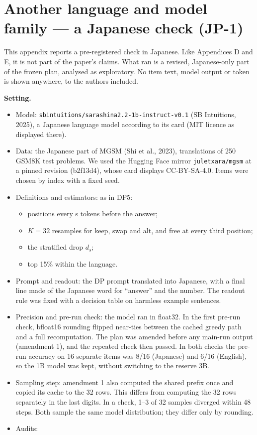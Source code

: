 \documentclass[
  10pt,
  a4paper,
]{article}
\providecommand{\tightlist}{%
  \setlength{\itemsep}{0pt}\setlength{\parskip}{0pt}}
\begin{document}
\hypertarget{another-language-and-model-family-a-japanese-check-jp-1}{%
\section{Another language and model family --- a Japanese check (JP-1)}\label{another-language-and-model-family-a-japanese-check-jp-1}}

This appendix reports a pre-registered check in Japanese. Like Appendices D and E, it is not part of the paper's claims. What ran is a revised, Japanese-only part of the frozen plan, analysed as
exploratory. No item text, model output or token is shown anywhere, to the authors included.

\textbf{Setting.}

\begin{itemize}
\tightlist
\item
  Model: \texttt{sbintuitions/sarashina2.2-1b-instruct-v0.1} (SB Intuitions, 2025), a Japanese language model according to its card (MIT licence as displayed there).
\item
  Data: the Japanese part of MGSM (Shi et al., 2023), translations of 250 GSM8K test problems. We used the Hugging Face mirror \texttt{juletxara/mgsm} at a pinned revision (b2f13d4), whose card
  displays CC-BY-SA-4.0. Items were chosen by index with a fixed seed.
\item
  Definitions and estimators: as in DP5:

  \begin{itemize}
  \tightlist
  \item
    positions every s tokens before the answer;
  \item
    \(K = 32\) resamples for keep, swap and alt, and free at every third position;
  \item
    the stratified drop \(d_{s}\);
  \item
    top 15\% within the language.
  \end{itemize}
\item
  Prompt and readout: the DP prompt translated into Japanese, with a final line made of the Japanese word for ``answer'' and the number. The readout rule was fixed with a decision table on harmless
  example sentences.
\item
  Precision and pre-run check: the model ran in float32. In the first pre-run check, bfloat16 rounding flipped near-ties between the cached greedy path and a full recomputation. The plan was amended
  before any main-run output (amendment 1), and the repeated check then passed. In both checks the pre-run accuracy on 16 separate items was 8/16 (Japanese) and 6/16 (English), so the 1B model was
  kept, without switching to the reserve 3B.
\item
  Sampling step: amendment 1 also computed the shared prefix once and copied its cache to the 32 rows. This differs from computing the 32 rows separately in the last digits. In a check, 1--3 of 32
  samples diverged within 48 steps. Both sample the same model distribution; they differ only by rounding.
\item
  Audits:


\end{itemize}
\end{document}
